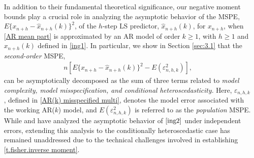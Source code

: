 \documentclass[ejsv2]{imsart}
\theoremstyle{plain}
\theoremstyle{definition}
\theoremstyle{remark}
\begin{document}
In addition to their fundamental theoretical significance, our negative moment bounds play a crucial role in analyzing the asymptotic behavior of the MSPE,
$E\{x_{n+h}-\hat{x}_{n+h}(k)\}^2$,
of the $h$-step LS predictor, $\hat{x}_{n+h}(k)$, for $x_{n+h}$, when \eqref{AR mean part} is approximated by an
AR model of order $k \geq 1$,
with $h \geq 1$
and $\hat{x}_{n+h}(k)$ defined in \eqref{ing1}.
In particular, we show in Section \ref{sec:3.1}
that %
the {\it second-order} MSPE,
\begin{eqnarray}
\label{ing2}
n[E\{x_{n+h}-\hat{x}_{n+h}(k)\}^2-E(\varepsilon_{n,h,k}^2)],
\end{eqnarray}
can be asymptotically decomposed
as the sum of three terms related to
{\it model complexity,
model misspecification, and conditional heteroscedasticity.}
Here, $\varepsilon_{n, h, k}$, defined in \eqref{AR(k) misspecified multi},
denotes the model error associated with the working AR($k$) model,
and $E(\varepsilon_{n,h,k}^2)$
is referred to as the {\it population}
MSPE.
While
 \cite{Kunitomo1985a} and
\cite{Ing2003a} 
have analyzed the asymptotic behavior of
$\eqref{ing2}$ under independent errors,
 extending this analysis to the conditionally heteroscedastic case has remained unaddressed due to the technical challenges involved in establishing
\eqref{t.fisher.inverse moment}.






\end{document}
